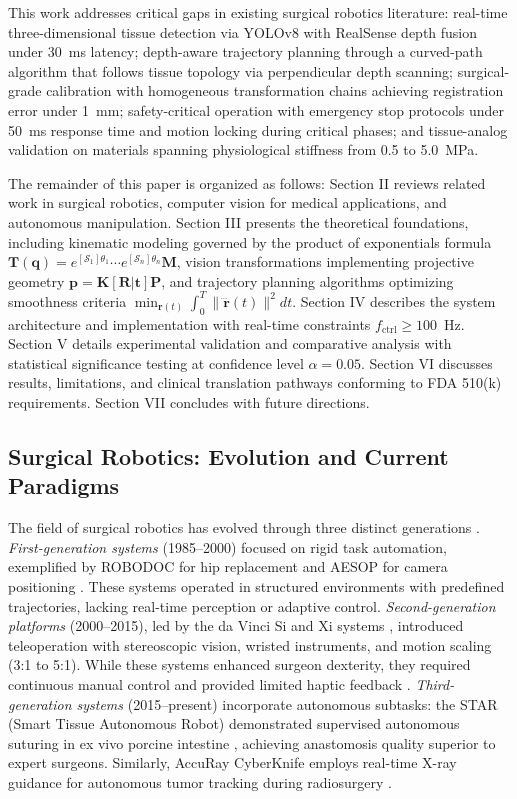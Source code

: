 \documentclass[journal]{IEEEtran}
\begin{document}
This work addresses critical gaps in existing surgical robotics literature: real-time three-dimensional tissue detection via YOLOv8 with RealSense depth fusion under 30~ms latency; depth-aware trajectory planning through a curved-path algorithm that follows tissue topology via perpendicular depth scanning; surgical-grade calibration with homogeneous transformation chains achieving registration error under 1~mm; safety-critical operation with emergency stop protocols under 50~ms response time and motion locking during critical phases; and tissue-analog validation on materials spanning physiological stiffness from 0.5 to 5.0~MPa.

The remainder of this paper is organized as follows: Section II reviews related work in surgical robotics, computer vision for medical applications, and autonomous manipulation. Section III presents the theoretical foundations, including kinematic modeling governed by the product of exponentials formula $\mathbf{T}(\boldsymbol{q}) = e^{[\mathcal{S}_1]\theta_1} \cdots e^{[\mathcal{S}_n]\theta_n} \mathbf{M}$, vision transformations implementing projective geometry $\mathbf{p} = \mathbf{K}[\mathbf{R}|\mathbf{t}]\mathbf{P}$, and trajectory planning algorithms optimizing smoothness criteria $\min_{\mathbf{r}(t)} \int_0^T \|\dddot{\mathbf{r}}(t)\|^2 dt$. Section IV describes the system architecture and implementation with real-time constraints $f_{\text{ctrl}} \geq 100$~Hz. Section V details experimental validation and comparative analysis with statistical significance testing at confidence level $\alpha = 0.05$. Section VI discusses results, limitations, and clinical translation pathways conforming to FDA 510(k) requirements. Section VII concludes with future directions.

\subsection{Surgical Robotics: Evolution and Current Paradigms}

The field of surgical robotics has evolved through three distinct generations \cite{gomes2011surgical}. \textit{First-generation systems} (1985--2000) focused on rigid task automation, exemplified by ROBODOC for hip replacement \cite{taylor1994augmentation} and AESOP for camera positioning \cite{kavoussi1995comparison}. These systems operated in structured environments with predefined trajectories, lacking real-time perception or adaptive control. \textit{Second-generation platforms} (2000--2015), led by the da Vinci Si and Xi systems \cite{intuitive2023davinci}, introduced teleoperation with stereoscopic vision, wristed instruments, and motion scaling (3:1 to 5:1). While these systems enhanced surgeon dexterity, they required continuous manual control and provided limited haptic feedback \cite{okamura2004haptic}. \textit{Third-generation systems} (2015--present) incorporate autonomous subtasks: the STAR (Smart Tissue Autonomous Robot) demonstrated supervised autonomous suturing in ex vivo porcine intestine \cite{shademan2016supervised}, achieving anastomosis quality superior to expert surgeons. Similarly, AccuRay CyberKnife employs real-time X-ray guidance for autonomous tumor tracking during radiosurgery \cite{schweikard2000robotic}.
\end{document}
